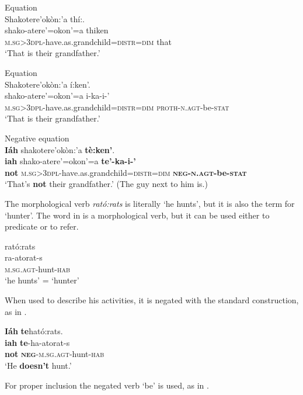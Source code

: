 \documentclass[output=paper,colorlinks,citecolor=brown]{langscibook}
\begin{document}
\ea\label{ex:moh:51}Equation\\
    \glll Shakotere’okòn:’a thí:.\\
         shako-atere’=okon’=a thiken \\
         \textsc{m.sg>3dpl}-have.as.grandchild=\textsc{distr=dim} that\\
    \glt ‘That is their grandfather.’
\z

\ea\label{ex:moh:52}Equation\\
    \glll Shakotere’okòn:’a í:ken’. \\
         shako-atere’=okon’=a i-ka-i-’\\
         \textsc{m.sg>3dpl}-have.as.grandchild=\textsc{distr=dim} \textsc{proth-n.agt}-be-\textsc{stat}\\
    \glt ‘That is their grandfather.’
\z

\ea\label{ex:moh:53}Negative equation\\
    \glll \textbf{Iáh} shakotere’okòn:’a \textbf{tè:ken’}. \\ 
         \textbf{iah} shako-atere’=okon’=a \textbf{te’-ka-i-’} \\
         \textbf{not} \textsc{m.sg>3dpl}-have.as.grandchild\textsc{=distr=dim} \textbf{\textsc{neg-n.agt}-be-\textsc{stat}} \\
    \glt ‘That’s \textbf{not} their grandfather.’ (The guy next to him is.)
\z 

The morphological verb \textit{rató:rats} is literally ‘he hunts’, but it is also the term for ‘hunter’. The word in  is a morphological verb, but it can be used either to predicate or to refer.

\ea\label{ex:moh:54}
    \glll rató:rats \\ 
         ra-atorat-s \\
         \textsc{m.sg.agt}-hunt-\textsc{hab}\\
    \glt ‘he hunts’ = ‘hunter’
\z 

When used to describe his activities, it is negated with the standard construction, as in .

\ea\label{ex:moh:55}
    \glll \textbf{Iáh} \textbf{te}ható:rats. \\ 
          \textbf{iah} \textbf{te}-ha-atorat-s\\
          \textbf{not} \textbf{\textsc{neg}}\textsc{-m.sg.agt}-hunt-\textsc{hab}\\
    \glt ‘He \textbf{doesn’t} hunt.’
\z 

For proper inclusion the negated verb ‘be’ is used, as in . 
\end{document}

